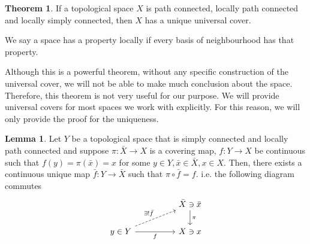 \documentclass[]{article}
\theoremstyle{definition}
\newtheorem{theorem}{Theorem}
\theoremstyle{definition}
\newtheorem{lemma}{Lemma}[section]
\begin{document}
\begin{theorem}
  If a topological space \(X\) is path connected, locally path connected and locally simply 
  connected, then \(X\) has a unique universal cover.

  We say a space has a property locally if every basis of neighbourhood has that 
  property.
\end{theorem}

Although this is a powerful theorem, without any specific construction of the universal 
cover, we will not be able to make much conclusion about the space. Therefore, 
this theorem is not very useful for our purpose. We will provide universal covers 
for most spaces we work with explicitly. For this reason, we will only provide the 
proof for the uniqueness.

\begin{lemma}
  Let \(Y\) be a topological space that is simply connected and locally path connected
  and suppose \(\pi : \bar X \to X\) is a covering map, \(f : Y \to X\) be 
  continuous such that \(f(y) = \pi(\bar x) = x\) for some \(y \in Y, \bar x \in \bar X, x \in X\). 
  Then, there exists a continuous unique map \(\bar f : Y \to \bar X\) such that 
  \(\pi \circ \bar f = f\). i.e. the following diagram commutes
  \[\begin{tikzcd}
    && {\bar X \ni \bar x} \\
    {y \in Y} && {X\ni x}
    \arrow["\pi", from=1-3, to=2-3]
    \arrow["f"', from=2-1, to=2-3]
    \arrow["{\exists! \bar f}", dashed, from=2-1, to=1-3]
  \end{tikzcd}\]
\end{lemma}
\end{document}
